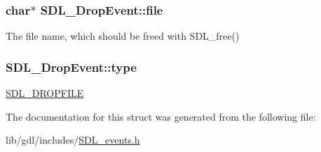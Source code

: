 \subsubsection[{file}]{\setlength{\rightskip}{0pt plus 5cm}char$\ast$ S\+D\+L\+\_\+\+Drop\+Event\+::file}\label{struct_s_d_l___drop_event_abc41ef4beb62e1d8b56827128b29585f}
The file name, which should be freed with S\+D\+L\+\_\+free() \hypertarget{struct_s_d_l___drop_event_a5ea27cfaa5f8d4940e9a69b68b3cc035}{}
\subsubsection[{type}]{ S\+D\+L\+\_\+\+Drop\+Event\+::type}\label{struct_s_d_l___drop_event_a5ea27cfaa5f8d4940e9a69b68b3cc035}
\hyperlink{_s_d_l__events_8h_a3b589e89be6b35c02e0dd34a55f3fccaad9238862d7aeaebff88be6453ee0fbab}{S\+D\+L\+\_\+\+D\+R\+O\+P\+F\+I\+L\+E} 

The documentation for this struct was generated from the following file\+:\begin{DoxyCompactItemize}
\item 
lib/gdl/includes/\hyperlink{_s_d_l__events_8h}{S\+D\+L\+\_\+events.\+h}\end{DoxyCompactItemize}
